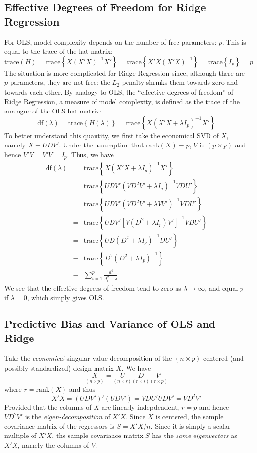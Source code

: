 \documentclass[12pt]{article}
\theoremstyle{definition}
\begin{document}
\subsection{Effective Degrees of Freedom for Ridge Regression}

For OLS, model complexity depends on the number of free parameters: $p$. This is equal to the trace of the hat matrix:
	$$\mbox{trace}(H) = \mbox{trace}\left\{ X(X'X)^{-1}X'\right\} = \mbox{trace}\left\{X'X(X'X)^{-1} \right\} = \mbox{trace}\left\{ I_p\right\}=p$$
The situation is more complicated for Ridge Regression since, although there are $p$ parameters, they are not free: the $L_2$ penalty shrinks them towards zero and towards each other. By analogy to OLS, the ``effective degrees of freedom'' of Ridge Regression, a measure of model complexity, is defined as the trace of the analogue of the OLS hat matrix:
	 $$\mbox{df}(\lambda) =\mbox{trace}\left\{ H(\lambda)\right\} =  \mbox{trace}\left\{ X(X'X + \lambda I_p)^{-1} X'\right\}$$
To better understand this quantity, we first take the economical SVD of $X$, namely $X = UDV'$. Under the assumption that $\mbox{rank}(X) = p$, $V$ is $(p\times p)$ and hence $V'V = V'V = I_p$. Thus, we have
	\begin{eqnarray*}
		\mbox{df}(\lambda) &=&  \mbox{trace}\left\{ X(X'X + \lambda I_p)^{-1} X'\right\}\\
		&=& \mbox{trace}\left\{UDV' (VD^2V' + \lambda I_p)^{-1}VDU' \right\}\\
		&=& \mbox{trace}\left\{UDV' (VD^2V' + \lambda VV')^{-1}VDU' \right\}\\
		&=& \mbox{trace}\left\{UDV' \left[V(D^2 + \lambda I_p)V' \right]^{-1}VDU' \right\}\\
		&=&\mbox{trace}\left\{UD(D^2 + \lambda I_p)^{-1}DU'\right\}\\
		&=& \mbox{trace}\left\{D^2(D^2 + \lambda I_p)^{-1}\right\}\\
		&=& \sum_{i=1}^p \frac{d_i^2}{d_i^2 + \lambda}
	\end{eqnarray*}
We see that the effective degrees of freedom tend to zero as $\lambda \rightarrow \infty$, and equal $p$ if $\lambda = 0$, which simply gives OLS. 

\subsection{Predictive Bias and Variance of OLS and Ridge}

Take the \emph{economical} singular value decomposition of the $(n\times p)$ centered (and possibly standardized) design matrix $X$. We have
	$$\underset{(n\times p)}{X} = \underset{(n\times r)}{U} \underset{(r\times r)}{D} \underset{(r\times p)}{V'}$$
where $r = \mbox{rank}(X)$ and thus
	$$X'X = (UDV')'(UDV') = VDU'UDV' = VD^2V'$$
Provided that the columns of $X$ are linearly indepdendent, $r = p$ and hence $VD^2 V'$ is the \emph{eigen-decomposition} of $X'X$. Since $X$ is centered, the sample covariance matrix of the regressors is $S = X'X/n$. Since it is simply a scalar multiple of $X'X$, the sample covariance matrix $S$ has the \emph{same eigenvectors} as $X'X$, namely the columns of $V$.
\end{document}

